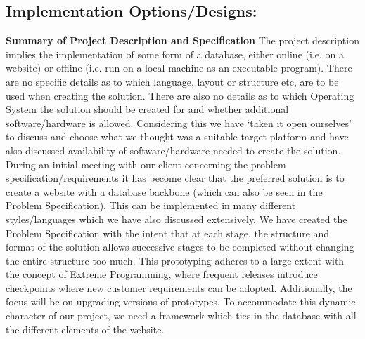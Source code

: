 \subsection{Implementation Options/Designs: }
\vspace {5 mm}
\textbf{Summary of Project Description and Specification}
\newline
\newline
The project description implies the implementation of some form of a database, either online (i.e. on a website) or offline (i.e. run on a local machine as an executable program). There are no specific details as to which language, layout or structure etc, are to be used when creating the solution. There are also no details as to which Operating System the solution should be created for and whether additional software/hardware is allowed. Considering this we have ‘taken it open ourselves’ to discuss and choose what we thought was a suitable target platform and have also discussed availability of software/hardware needed to create the solution.
During an initial meeting with our client concerning the problem specification/requirements it has become clear that the preferred solution is to create a website with a database backbone (which can also be seen in the Problem Specification). This can be implemented in many different styles/languages which we have also discussed extensively. 
We have created the Problem Specification with the intent that at each stage, the structure and format of the solution allows successive stages to be completed without changing the entire structure too much. This prototyping adheres to a large extent with the concept of Extreme Programming, where frequent releases introduce checkpoints where new customer requirements can be adopted. Additionally, the focus will be on upgrading versions of prototypes. To accommodate this dynamic character of our project, we need a framework which ties in the database with all the different elements of the website.
\newline
\newline
